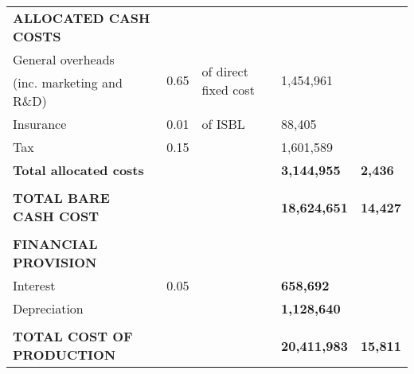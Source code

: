 \begin{table}[H]
\begin{tabular}{llllll}
\textbf{ALLOCATED CASH COSTS}           &                       &                                       &                           & \textbf{}                  &                      \\
General overheads                       & \multirow{2}{*}{0.65} & \multirow{2}{*}{of direct fixed cost} &                           & \multirow{2}{*}{1,454,961} &                      \\
(inc. marketing and R\&D)               &                       &                                       &                           &                            &                      \\
Insurance                               & 0.01                  & of ISBL                               &                           & 88,405                     &                      \\
Tax                                     & 0.15                  &                                       &                           & 1,601,589                  &                      \\ \cline{5-6} 
\textbf{Total allocated costs}          &                       &                                       &                           & \textbf{3,144,955}         & \textbf{2,436}       \\
                                        &                       &                                       &                           & \textbf{}                  &                      \\ \cline{5-6} 
\textbf{TOTAL BARE CASH COST}           &                       &                                       &                           & \textbf{18,624,651}        & \textbf{14,427}      \\
                                        &                       &                                       &                           & \textbf{}                  &                      \\
\textbf{FINANCIAL PROVISION}            &                       &                                       &                           & \textbf{}                  &                      \\
Interest                                & 0.05                  &                                       &                           & \textbf{658,692}           &                      \\
Depreciation                            &                       &                                       &                           & \textbf{1,128,640}         &                      \\
                                        &                       &                                       &                           & \textbf{}                  &                      \\ \cline{5-6} 
\textbf{TOTAL COST OF PRODUCTION}       &                       &                                       &                           & \textbf{20,411,983}        & \textbf{15,811}     
\end{tabular}
\end{table}


